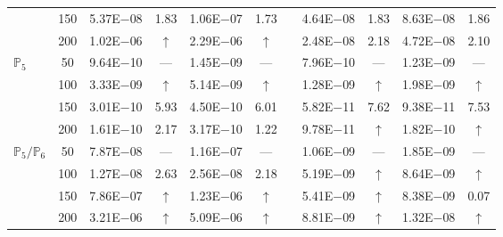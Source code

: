 \begin{table}[H]
{\begin{tabular}{@{}l c c c c c c c c c c@{}}
 & 150 & 5.37E$-$08 & 1.83  & 1.06E$-$07 & 1.73 &  & 4.64E$-$08 & 1.83 & 8.63E$-$08 & 1.86\\
 & 200 & 1.02E$-$06 & $\uparrow$  & 2.29E$-$06 & $\uparrow$ &  & 2.48E$-$08 & 2.18 & 4.72E$-$08 & 2.10\\
\midrule
\multirow{4}{*}{$\mathbb{P}_{5}$}
 & 50 & 9.64E$-$10 & ---  & 1.45E$-$09 & --- &  & 7.96E$-$10 & --- & 1.23E$-$09 & ---\\
 & 100 & 3.33E$-$09 & $\uparrow$  & 5.14E$-$09 & $\uparrow$ &  & 1.28E$-$09 & $\uparrow$ & 1.98E$-$09 & $\uparrow$\\
 & 150 & 3.01E$-$10 & 5.93  & 4.50E$-$10 & 6.01 &  & 5.82E$-$11 & 7.62 & 9.38E$-$11 & 7.53\\
 & 200 & 1.61E$-$10 & 2.17  & 3.17E$-$10 & 1.22 &  & 9.78E$-$11 & $\uparrow$ & 1.82E$-$10 & $\uparrow$\\
\midrule
\multirow{4}{*}{$\mathbb{P}_{5}/\mathbb{P}_{6}$}
 & 50 & 7.87E$-$08 & ---  & 1.16E$-$07 & --- &  & 1.06E$-$09 & --- & 1.85E$-$09 & ---\\
 & 100 & 1.27E$-$08 & 2.63  & 2.56E$-$08 & 2.18 &  & 5.19E$-$09 & $\uparrow$ & 8.64E$-$09 & $\uparrow$\\
 & 150 & 7.86E$-$07 & $\uparrow$  & 1.23E$-$06 & $\uparrow$ &  & 5.41E$-$09 & $\uparrow$ & 8.38E$-$09 & 0.07\\
 & 200 & 3.21E$-$06 & $\uparrow$  & 5.09E$-$06 & $\uparrow$ &  & 8.81E$-$09 & $\uparrow$ & 1.32E$-$08 & $\uparrow$\\
\bottomrule
\end{tabular}}
\label{none}
\end{table}

